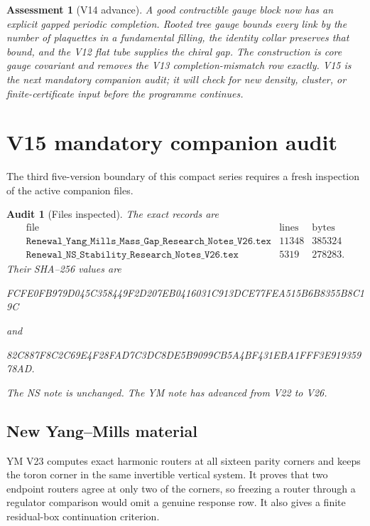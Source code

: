 \documentclass[11pt]{article}
\newtheorem{assessment}[theorem]{Assessment}
\newtheorem{audit}[theorem]{Audit}
\begin{document}
\begin{assessment}[V14 advance]
\label{ass:v11v14}
A good contractible gauge block now has an explicit gapped periodic
completion.  Rooted tree gauge bounds every link by the number of
plaquettes in a fundamental filling, the identity collar preserves that
bound, and the V12 flat tube supplies the chiral gap.  The construction is
core gauge covariant and removes the V13 completion-mismatch row exactly.
V15 is the next mandatory companion audit; it will check for new density,
cluster, or finite-certificate input before the programme continues.
\end{assessment}


\section{V15 mandatory companion audit}
\label{sec:v11v15}

The third five-version boundary of this compact series requires a fresh
inspection of the active companion files.

\begin{audit}[Files inspected]
\label{audit:v11v15-files}
The exact records are
\[
\begin{array}{c|r|r}
\text{file}&\text{lines}&\text{bytes}\\ \hline
\texttt{Renewal\_Yang\_Mills\_Mass\_Gap\_Research\_Notes\_V26.tex}
&11348&385324\\
\texttt{Renewal\_NS\_Stability\_Research\_Notes\_V26.tex}
&5319&278283.
\end{array}
\]
Their SHA--256 values are
\begin{center}
\small\ttfamily
FCFE0FB979D045C358449F2D207EB0416031C913DCE77FEA515B6B8355B8C19C
\end{center}
and
\begin{center}
\small\ttfamily
82C887F8C2C69E4F28FAD7C3DC8DE5B9099CB5A4BF431EBA1FFF3E91935978AD.
\end{center}
The NS note is unchanged.  The YM note has advanced from V22 to V26.
\end{audit}

\subsection{New Yang--Mills material}

YM V23 computes exact harmonic routers at all sixteen parity corners and
keeps the toron corner in the same invertible vertical system.  It proves
that two endpoint routers agree at only two of the corners, so freezing a
router through a regulator comparison would omit a genuine response row.
It also gives a finite residual-box continuation criterion.
\end{document}
